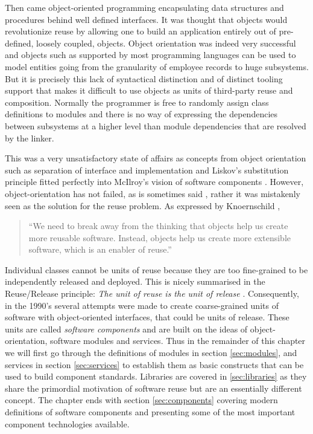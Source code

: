 Then came object-oriented programming encapsulating data structures and procedures behind well defined interfaces. It was thought that
objects would revolutionize reuse by allowing one to build an application entirely out of pre-defined, loosely coupled, objects. 
Object orientation was indeed very successful and objects such as supported by most programming languages can be used to model
entities going from the granularity of employee records to huge subsystems. But it is precisely this lack of syntactical distinction and
of distinct tooling support that makes it difficult to use objects as units of third-party reuse and composition. Normally the programmer is
free to randomly assign class definitions to modules and there is no way of expressing the dependencies between subsystems
at a higher level than module dependencies that are resolved by the linker.

This was a very unsatisfactory state of affairs as concepts from object orientation such as separation of interface and implementation
and Liskov's substitution principle fitted perfectly into McIlroy's vision of software components \cite{Liskov}. However, object-orientation
has not failed, as is sometimes said \cite{Udell}, rather it was mistakenly seen as the solution for the reuse problem. As expressed by Knoernschild
\cite{Knoernschild},

\begin{quotation}
``We need to break away from the thinking that objects help us create more reusable software.
Instead, objects help us create more extensible software, which is an enabler of reuse.''
\end{quotation}

Individual classes cannot be units of reuse because they are too fine-grained to be independently released and deployed. This
is nicely summarised in the Reuse/Release principle: \emph{The unit of reuse is the unit of release} \cite{Martin}.
Consequently, in the 1990's several attempts were made to create coarse-grained units of software with object-oriented interfaces,
that could be units of release. These units are called \emph{software components} and are built on the ideas of object-orientation,
software modules and services. Thus in the remainder of this chapter we will first go through the definitions of modules in section
\ref{sec:modules}, and services in section \ref{sec:services} to establish them as basic constructs that can be used to build
component standards. Libraries are covered in \ref{sec:libraries} as they share the primordial motivation of software reuse but
are an essentially different concept. The chapter ends with section \ref{sec:components} covering modern definitions of software
components and presenting some of the most important component technologies available.



